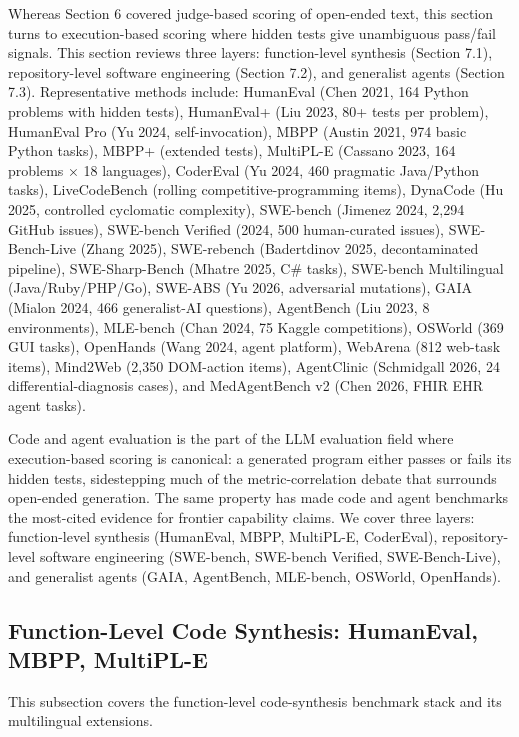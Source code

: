 Whereas Section 6 covered judge-based scoring of open-ended text, this section turns to execution-based scoring where hidden tests give unambiguous pass/fail signals. This section reviews three layers: function-level synthesis (Section 7.1), repository-level software engineering (Section 7.2), and generalist agents (Section 7.3). Representative methods include: HumanEval (Chen 2021, 164 Python problems with hidden tests), HumanEval+ (Liu 2023, 80+ tests per problem), HumanEval Pro (Yu 2024, self-invocation), MBPP (Austin 2021, 974 basic Python tasks), MBPP+ (extended tests), MultiPL-E (Cassano 2023, 164 problems × 18 languages), CoderEval (Yu 2024, 460 pragmatic Java/Python tasks), LiveCodeBench (rolling competitive-programming items), DynaCode (Hu 2025, controlled cyclomatic complexity), SWE-bench (Jimenez 2024, 2,294 GitHub issues), SWE-bench Verified (2024, 500 human-curated issues), SWE-Bench-Live (Zhang 2025), SWE-rebench (Badertdinov 2025, decontaminated pipeline), SWE-Sharp-Bench (Mhatre 2025, C\# tasks), SWE-bench Multilingual (Java/Ruby/PHP/Go), SWE-ABS (Yu 2026, adversarial mutations), GAIA (Mialon 2024, 466 generalist-AI questions), AgentBench (Liu 2023, 8 environments), MLE-bench (Chan 2024, 75 Kaggle competitions), OSWorld (369 GUI tasks), OpenHands (Wang 2024, agent platform), WebArena (812 web-task items), Mind2Web (2,350 DOM-action items), AgentClinic (Schmidgall 2026, 24 differential-diagnosis cases), and MedAgentBench v2 (Chen 2026, FHIR EHR agent tasks).

Code and agent evaluation is the part of the LLM evaluation field where execution-based scoring is canonical: a generated program either passes or fails its hidden tests, sidestepping much of the metric-correlation debate that surrounds open-ended generation. The same property has made code and agent benchmarks the most-cited evidence for frontier capability claims. We cover three layers: function-level synthesis (HumanEval, MBPP, MultiPL-E, CoderEval), repository-level software engineering (SWE-bench, SWE-bench Verified, SWE-Bench-Live), and generalist agents (GAIA, AgentBench, MLE-bench, OSWorld, OpenHands).

\subsection{Function-Level Code Synthesis: HumanEval, MBPP, MultiPL-E}\label{function-level-code-synthesis-humaneval-mbpp-multipl-e}

This subsection covers the function-level code-synthesis benchmark stack and its multilingual extensions.

